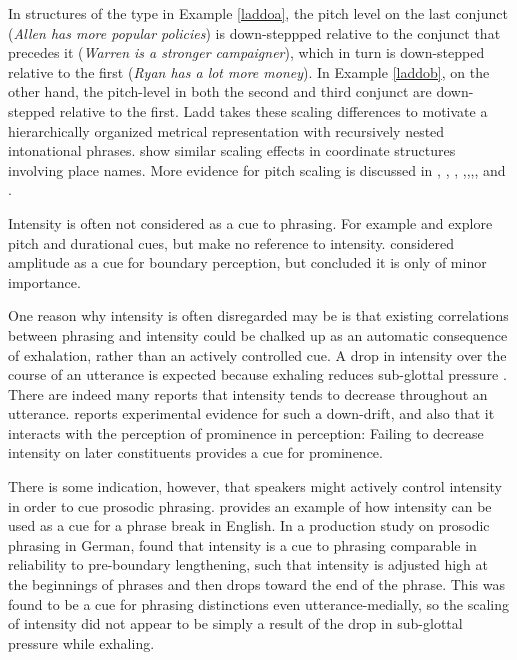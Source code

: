 \documentclass[preprint,review,12pt,authoryear,times]{elsarticle}
\begin{document}
\noindent In structures of the type in Example \ref{laddoa},  the pitch level on the last conjunct ({\em Allen has more popular policies}) is down-steppped relative to the conjunct that precedes it ({\em Warren is a stronger campaigner}), which in turn is down-stepped relative to the first ({\em Ryan has a lot more money}). In Example  \ref{laddob}, on the other hand, the pitch-level in both the second and third conjunct are down-stepped relative to the first. Ladd takes these scaling differences to motivate  a hierarchically organized metrical representation with recursively nested intonational phrases.  \citet{vanden92} show similar  scaling effects in coordinate structures involving place names. More evidence for pitch scaling is discussed in \citet{Kuboz89}, \citet{Kuboz92}, \citet{vanden92}, \citet{fery05},\citet{fery10b},\citet{kentn13},\citet{truck15}, and \citet{petro17}.


Intensity is often not considered as a cue to phrasing. For example  \citet{price91} and \citet{wight92} explore pitch and durational cues, but make no reference to intensity. \citet{stree78} considered amplitude as a cue for boundary perception, but concluded it is only of minor importance. 

One reason why intensity is often disregarded may be is that existing correlations between phrasing and intensity could be chalked up as an automatic consequence of exhalation, rather than an actively controlled cue. A drop in intensity over the course of an utterance is expected because exhaling reduces sub-glottal pressure \citep{bjork16}. There are indeed many reports that intensity tends to decrease throughout an utterance. \citet{pierr79} reports experimental evidence for such a down-drift, and also that it interacts with the perception of prominence in perception: Failing to decrease intensity on later constituents provides a cue for prominence.  

There is some indication, however, that speakers might actively control intensity in order to cue prosodic phrasing. \citet{trouv98} provides an example of how intensity can be used as a cue for a phrase break in English. In a production study on prosodic phrasing in German, \citet{poschmannwagner16} found that intensity is a cue to phrasing comparable in reliability to pre-boundary lengthening, such that intensity is adjusted high at the beginnings of phrases and then drops toward the end of the phrase. This was found to be a cue for phrasing distinctions even utterance-medially, so the scaling of intensity did not appear to be simply a result of the drop in sub-glottal pressure while exhaling.  
\end{document}
